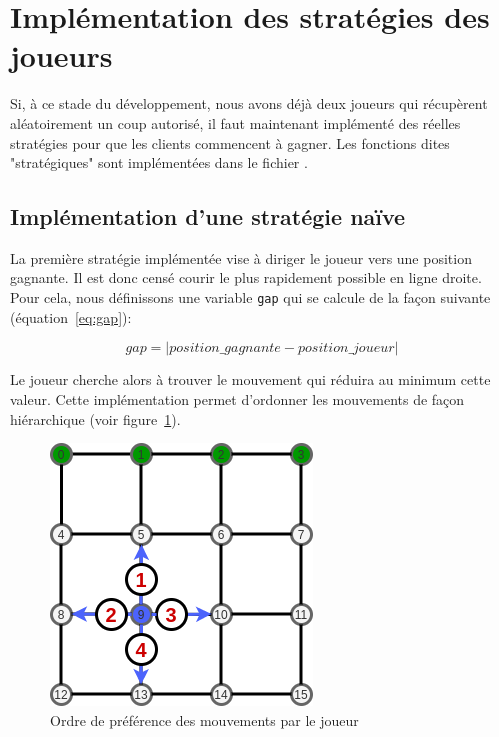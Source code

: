 \documentclass[a4paper]{article}
\begin{document}
\clearpage  
\section{Implémentation des stratégies des joueurs}

Si, à ce stade du développement, nous avons déjà deux joueurs qui récupèrent aléatoirement un coup autorisé, il faut maintenant implémenté des réelles stratégies pour que les clients commencent à gagner. Les fonctions dites "stratégiques" sont implémentées dans le fichier .

\subsection{Implémentation d'une stratégie naïve}

La première stratégie implémentée vise à diriger le joueur vers une position gagnante. Il est donc censé courir le plus rapidement possible en ligne droite. Pour cela, nous définissons une variable \texttt{gap} qui se calcule de la façon suivante (équation~\eqref{eq:gap}):

\begin{equation}
    gap = \lvert position\_gagnante - position\_joueur \rvert
    \label{eq:gap}
\end{equation}

Le joueur  cherche alors à trouver le mouvement qui réduira au minimum cette valeur. Cette implémentation permet d'ordonner les mouvements de façon hiérarchique (voir figure~\ref{fig:rush1}).

\begin{figure}[ht]
    \centering
    \includegraphics[scale=0.65]{rush1.png}
    \caption{Ordre de préférence des mouvements par le joueur }
    \label{fig:rush1}
\end{figure}
\end{document}
